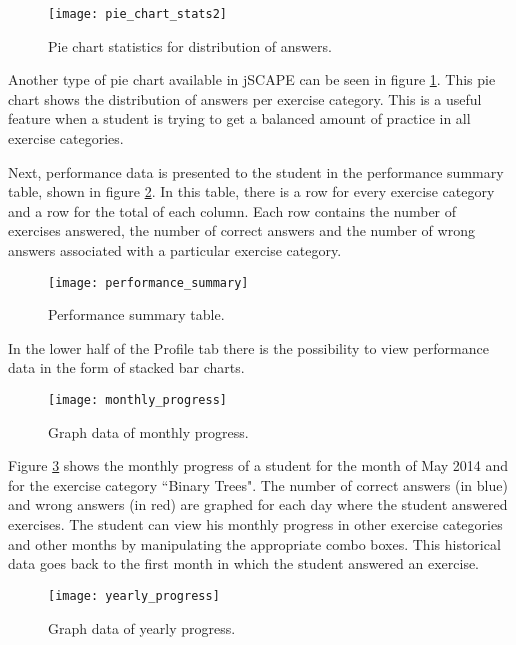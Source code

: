 \begin{figure}[H]
\centering
\texttt{[image: pie\_chart\_stats2]}
\caption{Pie chart statistics for distribution of answers.}
\label{fig:pie_chart_stats2}
\end{figure}

Another type of pie chart available in jSCAPE can be seen in figure \ref{fig:pie_chart_stats2}. This pie chart shows the distribution of answers per exercise category. This is a useful feature when a student is trying to get a balanced amount of practice in all exercise categories. \newline

Next, performance data is presented to the student in the performance summary table, shown in figure \ref{fig:performance_summary}. In this table, there is a row for every exercise category and a row for the total of each column. Each row contains the number of exercises answered, the number of correct answers and the number of wrong answers associated with a particular exercise category.

\begin{figure}[H]
\centering
\texttt{[image: performance\_summary]}
\caption{Performance summary table.}
\label{fig:performance_summary}
\end{figure}

In the lower half of the Profile tab there is the possibility to view performance data in the form of stacked bar charts.

\begin{figure}[H]
\centering
\texttt{[image: monthly\_progress]}
\caption{Graph data of monthly progress.}
\label{fig:monthly_progress}
\end{figure}

Figure \ref{fig:monthly_progress} shows the monthly progress of a student for the month of May 2014 and for the exercise category ``Binary Trees". The number of correct answers (in blue) and wrong answers (in red) are graphed for each day where the student answered exercises. The student can view his monthly progress in other exercise categories and other months by manipulating the appropriate combo boxes. This historical data goes back to the first month in which the student answered an exercise.

\begin{figure}[H]
\centering
\texttt{[image: yearly\_progress]}
\caption{Graph data of yearly progress.}
\label{fig:yearly_progress}
\end{figure}

